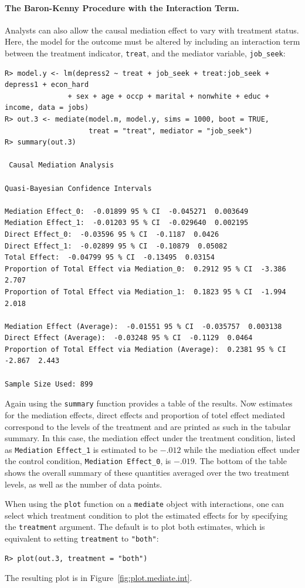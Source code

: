 \documentclass[11pt,letterpaper]{article}
\theoremstyle{plain}
\begin{document}
\paragraph{The Baron-Kenny Procedure with the Interaction Term.}
Analysts can also allow the causal mediation effect to vary with
treatment status.  Here, the model for the outcome must be altered by
including an interaction term between the treatment indicator,
\texttt{treat}, and the mediator variable, \texttt{job\_seek}:
\begin{verbatim}
R> model.y <- lm(depress2 ~ treat + job_seek + treat:job_seek + depress1 + econ_hard
               + sex + age + occp + marital + nonwhite + educ + income, data = jobs)
R> out.3 <- mediate(model.m, model.y, sims = 1000, boot = TRUE,
                    treat = "treat", mediator = "job_seek")
R> summary(out.3)

 Causal Mediation Analysis 

Quasi-Bayesian Confidence Intervals

Mediation Effect_0:  -0.01899 95 % CI  -0.045271  0.003649 
Mediation Effect_1:  -0.01203 95 % CI  -0.029640  0.002195 
Direct Effect_0:  -0.03596 95 % CI  -0.1187  0.0426 
Direct Effect_1:  -0.02899 95 % CI  -0.10879  0.05082 
Total Effect:  -0.04799 95 % CI  -0.13495  0.03154 
Proportion of Total Effect via Mediation_0:  0.2912 95 % CI  -3.386  2.707 
Proportion of Total Effect via Mediation_1:  0.1823 95 % CI  -1.994  2.018 

Mediation Effect (Average):  -0.01551 95 % CI  -0.035757  0.003138 
Direct Effect (Average):  -0.03248 95 % CI  -0.1129  0.0464 
Proportion of Total Effect via Mediation (Average):  0.2381 95 % CI  -2.867  2.443 

Sample Size Used: 899 
\end{verbatim}
Again using the \texttt{summary} function provides a table of the
results. Now estimates for the mediation effects, direct effects and
proportion of totel effect mediated correspond
to the levels of the treatment and are printed as such in the tabular
summary.  In this case, the mediation effect under the treatment
condition, listed as \texttt{Mediation Effect\_1} is estimated to be
$-.012$ while the mediation effect under the control condition,
\texttt{Mediation Effect\_0}, is $-.019$.  The bottom of the table shows
the overall summary of these quantities averaged over the two treatment levels,
as well as the number of data points.

When using the {\tt plot} function on a {\tt mediate} object with interactions,
one can select which treatment condition to plot the estimated effects for by
specifying the {\tt treatment} argument.  The default is to plot both estimates,
which is equivalent to setting {\tt treatment} to {\tt "both"}:
\begin{verbatim}
R> plot(out.3, treatment = "both")
\end{verbatim}
The resulting plot is in Figure~\ref{fig:plot.mediate.int}.
\end{document}
